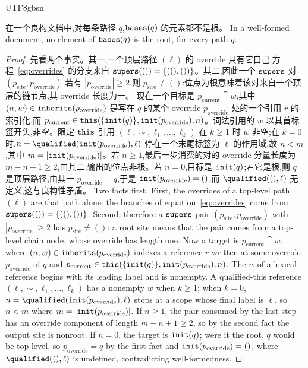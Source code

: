 \begin{CJK*}{UTF8}{gbsn}
\begin{lemma}\label{lem:nonroot-targets}
\ifPaperChinese
在一个良构文档中,对每条路径 $q$,$\mathtt{bases}(q)$ 的元素都不是根。
\else
In a well-formed document, no element of $\mathtt{bases}(q)$ is the root, for every path $q$.
\fi
\end{lemma}

\begin{proof}
\ifPaperChinese
先看两个事实。其一,一个顶层路径 $(\ell)$ 的 override 只有它自己:方程~\eqref{eq:overrides} 的分支来自 $\mathtt{supers}(()) = \{((), ())\}$。其二,因此一个 $\mathtt{supers}$ 对 $(p_{\mathrm{site}}, p_{\mathrm{override}})$ 若有 $|p_{\mathrm{override}}| \ge 2$,则 $p_{\mathrm{site}} \neq ()$:位点为根意味着该对来自一个顶层的链节点,其 override 长度为一。
现在一个目标是 $p_{\mathrm{current}} \cat w$,其中 $(n, w) \in \mathtt{inherits}(p_{\mathrm{override}})$ 是写在 $q$ 的某个 override $p_{\mathrm{override}}$ 处的一个引用 $r$ 的索引化,而 $p_{\mathrm{current}} \in \mathtt{this}(\{\mathtt{init}(q)\}, \mathtt{init}(p_{\mathrm{override}}), n)$。词法引用的 $w$ 以其首标签开头,非空。限定 $\mathtt{this}$ 引用 $(\ell, {\sim}, \ell_1, \ldots, \ell_k)$ 在 $k \ge 1$ 时 $w$ 非空;在 $k = 0$ 时,$n = \qualified(\init(p_{\mathrm{override}}), \ell)$ 停在一个末尾标签为 $\ell$ 的作用域,故 $n < m$,其中 $m = |\mathtt{init}(p_{\mathrm{override}})|$。若 $n \ge 1$,最后一步消费的对的 override 分量长度为 $m - n + 1 \ge 2$,由其二,输出的位点非根。若 $n = 0$,目标是 $\mathtt{init}(q)$;若它是根,则 $q$ 是顶层路径,由其一 $p_{\mathrm{override}} = q$,于是 $\mathtt{init}(p_{\mathrm{override}}) = ()$,而 $\qualified((), \ell)$ 无定义,这与良构性矛盾。
\else
Two facts first. First, the overrides of a top-level path $(\ell)$ are that path alone: the branches of
equation~\eqref{eq:overrides} come from $\mathtt{supers}(()) = \{((), ())\}$. Second, therefore a $\mathtt{supers}$
pair $(p_{\mathrm{site}}, p_{\mathrm{override}})$ with $|p_{\mathrm{override}}| \ge 2$ has
$p_{\mathrm{site}} \neq ()$: a root site means that the pair comes from a top-level chain node, whose
override has length one.
Now a target is $p_{\mathrm{current}} \cat w$, where $(n, w) \in \mathtt{inherits}(p_{\mathrm{override}})$ indexes a
reference $r$ written at some override $p_{\mathrm{override}}$ of $q$ and
$p_{\mathrm{current}} \in \mathtt{this}(\{\mathtt{init}(q)\}, \mathtt{init}(p_{\mathrm{override}}), n)$. The $w$ of a lexical
reference begins with its leading label and is nonempty. A qualified-this reference
$(\ell, {\sim}, \ell_1, \ldots, \ell_k)$ has a nonempty $w$ when $k \ge 1$; when $k = 0$,
$n = \qualified(\init(p_{\mathrm{override}}), \ell)$ stops at a scope whose final label is $\ell$, so
$n < m$ where $m = |\mathtt{init}(p_{\mathrm{override}})|$. If $n \ge 1$, the pair consumed by the last step has
an override component of length $m - n + 1 \ge 2$, so by the second fact the output site is nonroot. If
$n = 0$, the target is $\mathtt{init}(q)$; were it the root, $q$ would be top-level, so
$p_{\mathrm{override}} = q$ by the first fact and $\mathtt{init}(p_{\mathrm{override}}) = ()$, where
$\qualified((), \ell)$ is undefined, contradicting well-formedness.
\fi
\end{proof}


\end{CJK*}
